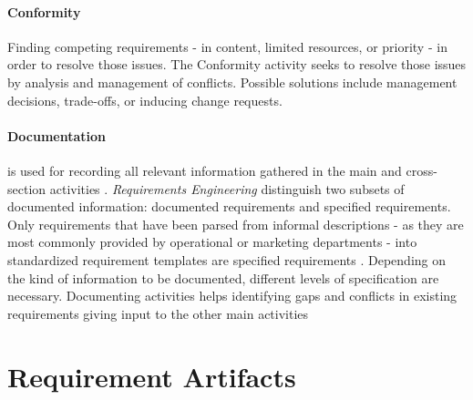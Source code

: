 \paragraph*{Conformity}
Finding competing requirements - in content, limited resources, or priority - in order to resolve those issues. The Conformity activity seeks to resolve those issues by analysis and management of conflicts. Possible solutions include management decisions, trade-offs, or inducing change requests. \parencite[cf.][393]{Pohl.2007}
\paragraph*{Documentation} is used for recording all relevant information gathered in the main and cross-section activities \parencite[cf.][217]{Pohl.2007}. \textit{Requirements Engineering} distinguish two subsets of documented information: documented requirements and specified requirements. Only requirements that have been parsed from informal descriptions - as they are most commonly provided by operational or marketing departments - into standardized requirement templates are specified requirements \parencite[cf.][101]{Ebert.2014}. Depending on the kind of information to be documented, different levels of specification are necessary. Documenting activities helps identifying gaps and conflicts in existing requirements giving input to the other main activities \parencite[212]{Pohl.2007}
\section{Requirement Artifacts}
